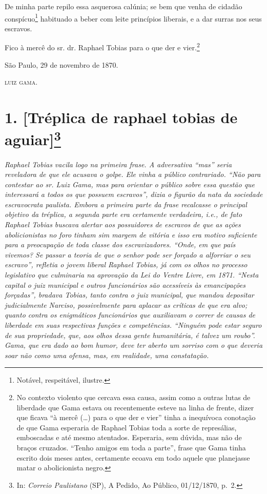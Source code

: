 {De minha parte repilo essa asquerosa calúnia; se bem que venha de
cidadão conspícuo\footnote{ Notável, respeitável, ilustre.}
habituado a beber com leite princípios liberais, e a dar surras nos seus
escravos.

Fico à mercê do sr. dr. Raphael Tobias para o que der e vier.\footnote{
  No contexto violento que cercava essa causa, assim como a outras lutas
  de liberdade que Gama estava ou recentemente esteve na linha de
  frente, dizer que ficava ``à mercê (\ldots) para o que der e vier''
  tinha a inequívoca conotação de que Gama esperaria de Raphael Tobias
  toda a sorte de represálias, emboscadas e até mesmo atentados.
  Esperaria, sem dúvida, mas não de braços cruzados. ``Tenho amigos em
  toda a parte'', frase que Gama tinha escrito dois meses antes,
  certamente ecoava em todo aquele que planejasse matar o abolicionista
  negro.}
\begin{flushright}
São Paulo, 29 de novembro de 1870.

\textsc{luiz gama}.
\end{flushright}

\chapter{1. {[}Tréplica de raphael tobias de aguiar{]}\footnote{ In: \emph{Correio Paulistano} (SP), A Pedido, Ao Público,
  01/12/1870, p.~2.}} %

\begin{didascalia}
\emph{Raphael Tobias vacila logo na primeira frase. A adversativa ``mas''
seria reveladora de que ele acusava o golpe. Ele vinha a público
contrariado. ``Não para contestar ao sr. Luiz Gama, mas para orientar o
público sobre essa questão que interessará a todos os que possuem
escravos'', dizia o figurão da nata da sociedade escravocrata paulista.
Embora a primeira parte da frase recalcasse o principal objetivo da
tréplica, a segunda parte era certamente verdadeira, i.e., de fato
Raphael Tobias buscava alertar aos possuidores de escravos de que as
ações abolicionistas no foro tinham sim margem de vitória e isso era
motivo suficiente para a preocupação de toda classe dos escravizadores.
``Onde, em que país vivemos? Se passar a teoria de que o senhor pode ser
forçado a alforriar o seu escravo'', refletia o jovem liberal Raphael
Tobias, já com os olhos no processo legislativo que culminaria na
aprovação da Lei do Ventre Livre, em 1871. ``Nesta capital o juiz
municipal e outros funcionários são acessíveis às emancipações
forçadas'', bradava Tobias, tanto contra o juiz municipal, que mandou
depositar judicialmente Narciso, possivelmente para aplacar as críticas
de que era alvo; quanto contra os enigmáticos funcionários que
auxiliavam o correr de causas de liberdade em suas respectivas funções e
competências. ``Ninguém pode estar seguro de sua propriedade, que, aos
olhos dessa gente humanitária, é talvez um roubo''. Gama, que era dado ao
bom humor, deve ter aberto um sorriso com o que deveria soar não como
uma ofensa, mas, em realidade, uma constatação.}
\end{didascalia}

}
